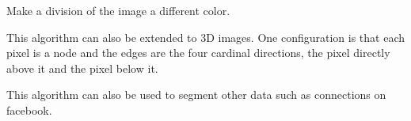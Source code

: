 \begin{problem}
Make a division of the image a different color.
\end{problem}

This algorithm can also be extended to 3D images.
One configuration is that each pixel is a node and the edges are the four cardinal directions, the pixel directly above it and the pixel below it.

This algorithm can also be used to segment other data such as connections on facebook. 
